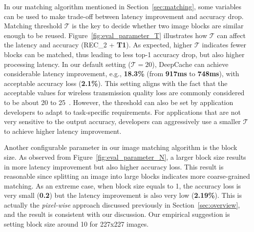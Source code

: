 \documentclass[10pt,acmtog]{acmart}
\newcommand{\framework}{DeepCache\xspace}
\begin{document}
In our matching algorithm mentioned in Section~\ref{sec:matching}, some variables can be used to make trade-off between latency improvement and accuracy drop.
Matching threshold $\mathcal{T}$ is the key to decide whether two image blocks are similar enough to be reused.
Figure~\ref{fig:eval_parameter_T} illustrates how $\mathcal{T}$ can affect the latency and accuracy (REC\_2 + \textbf{T1}).
As expected, higher $\mathcal{T}$ indicates fewer blocks can be matched, thus leading to less top-1 accuracy drop, but also higher processing latency.
In our default setting ($\mathcal{T} = 20$), \framework can achieve considerable latency improvement, e.g., \textbf{18.3\%} (from \textbf{917ms} to \textbf{748ms}), with acceptable accuracy loss (\textbf{2.1\%}).
This setting aligns with the fact that the acceptable values for wireless transmission quality loss are commonly considered to be about 20 to 25~\cite{psnr}.
However, the threshold can also be set by application developers to adapt to task-specific requirements.
For applications that are not very sensitive to the output accuracy, developers can aggressively use a smaller $\mathcal{T}$ to achieve higher latency improvement.

Another configurable parameter in our image matching algorithm is the block size.
As observed from Figure~\ref{fig:eval_parameter_N}, a larger block size results in more latency improvement but also higher accuracy loss.
This result is reasonable since splitting an image into large blocks indicates more coarse-grained matching.
As an extreme case, when block size equals to 1, the accuracy loss is very small (\textbf{0.2}) but the latency improvement is also very low (\textbf{2.19\%}).
This is actually the \emph{pixel-wise} approach discussed previously in Section~\ref{sec:overview}, and the result is consistent with our discussion.
Our empirical suggestion is setting block size around 10 for 227x227 images.
\end{document}
